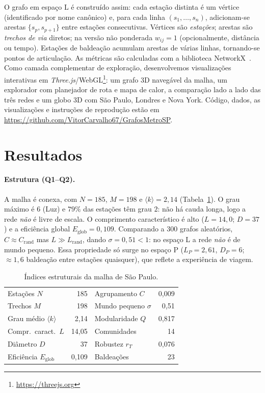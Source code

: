 \documentclass[12pt]{article}
\begin{document}
O grafo em espaço L é construído assim: cada estação distinta é um vértice
(identificado por nome canônico) e, para cada linha
$(s_1,\dots,s_{n})$, adicionam-se arestas $\{s_p,s_{p+1}\}$ entre estações
consecutivas. Vértices são \emph{estações}; arestas são \emph{trechos de via}
diretos; na versão não ponderada $w_{ij}=1$ (opcionalmente, distância ou tempo).
Estações de baldeação acumulam arestas de várias linhas, tornando-se pontos de
articulação. As métricas são calculadas com a biblioteca
NetworkX~\cite{hagberg2008}. Como camada complementar de exploração,
desenvolvemos visualizações interativas em \emph{Three.js}/WebGL\footnote{\url{https://threejs.org}}:
um grafo 3D navegável da malha, um explorador com planejador de rota e mapa de
calor, a comparação lado a lado das três redes e um globo 3D com São Paulo,
Londres e Nova York. Código, dados, as visualizações e instruções de reprodução
estão em \url{https://github.com/VitorCarvalho67/GrafosMetroSP}.

\section{Resultados}

\paragraph{Estrutura (Q1--Q2).} A malha é conexa, com $N=185$, $M=198$ e
$\langle k\rangle=2{,}14$ (Tabela~\ref{tab:metricas}). O grau máximo é $6$ (Luz)
e $79\%$ das estações têm grau $2$: não há cauda longa, logo a rede \emph{não} é
livre de escala. O comprimento característico é alto ($L=14{,}0$; $D=37$) e a
eficiência global $E_{\mathrm{glob}}=0{,}109$. Comparando a $300$ grafos
aleatórios, $C\approx C_{\mathrm{rand}}$ mas $L\gg L_{\mathrm{rand}}$, dando
$\sigma=0{,}51<1$: no espaço L a rede \emph{não} é de mundo pequeno. Essa
propriedade só surge no espaço P ($L_P=2{,}61$, $D_P=6$; $\approx 1{,}6$ baldeação
entre estações quaisquer), que reflete a experiência de viagem.

\begin{table}[ht]
  \centering
  \caption{Índices estruturais da malha de São Paulo.}
  \label{tab:metricas}
  \small
  \begin{tabular}{@{}lr lr@{}}
    \toprule
    Estações $N$ & 185 & Agrupamento $C$ & 0{,}009 \\
    Trechos $M$ & 198 & Mundo pequeno $\sigma$ & 0{,}51 \\
    Grau médio $\langle k\rangle$ & 2{,}14 & Modularidade $Q$ & 0{,}817 \\
    Compr.\ caract.\ $L$ & 14{,}05 & Comunidades & 14 \\
    Diâmetro $D$ & 37 & Robustez $r_T$ & 0{,}076 \\
    Eficiência $E_{\mathrm{glob}}$ & 0{,}109 & Baldeações & 23 \\
    \bottomrule
  \end{tabular}
\end{table}
\end{document}
